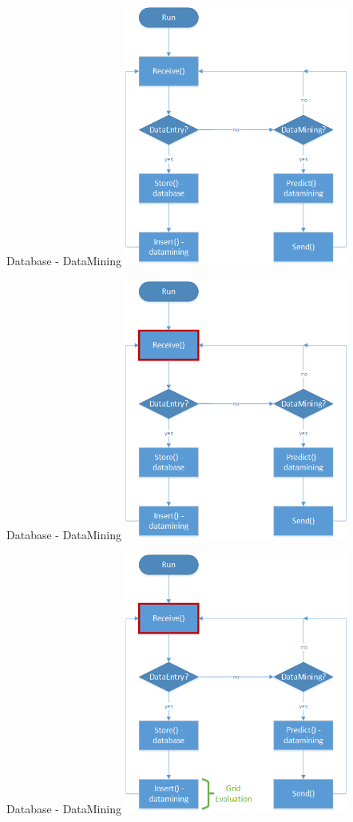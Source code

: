 	\begin{frame}{Database - DataMining}
	\includegraphics[width=0.55\textwidth]{images/datamining_flow.png}
	\end{frame}
	
	\begin{frame}{Database - DataMining}
	\includegraphics[width=0.55\textwidth]{images/datamining_flow0.png}
	\end{frame}
	
	\begin{frame}{Database - DataMining}
	\includegraphics[width=0.55\textwidth]{images/datamining_flow2.png}
	\end{frame}
	
